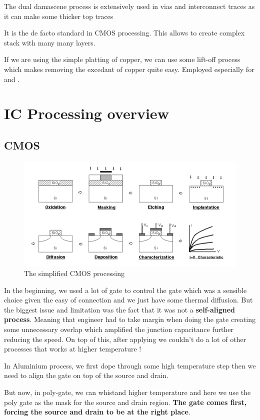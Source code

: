 \documentclass{report}
\begin{document}
The dual damascene process is extensively used in vias and interconnect traces as it can make some thicker top traces

It is the de facto standard in CMOS processing. This allows to create complex stack with many many layers.

If we are using the simple platting of copper, we can use some lift-off process which makes removing the excedant of copper quite easy. Employed especially for  and .


\chapter{IC Processing overview}

\section{CMOS}

\begin{figure}[H]
    \centering
    \includegraphics[width=0.5\linewidth]{simplified_CMOS.png}
    \caption{The simplified CMOS processing}
    \label{fig:enter-label}
\end{figure}

In the beginning, we used a lot of  gate to control the gate which was a sensible choice given the easy of connection and we just have some thermal diffusion. But the biggest issue and limitation was the fact that it was not a \textbf{self-aligned process}. Meaning that engineer had to take margin when doing the gate creating some unnecessary overlap which amplified the junction capacitance further reducing the speed. On top of this, after applying  we couldn't do a lot of other processes that works at higher temperature !

In Aluminium process, we first dope through some high temperature step then we need to align the gate on top of the source and drain.

But now, in poly-gate, we can whistand higher temperature and here we use the poly gate as the mask for the source and drain region. \textbf{The gate comes first, forcing the source and drain to be at the right place}.
\end{document}
